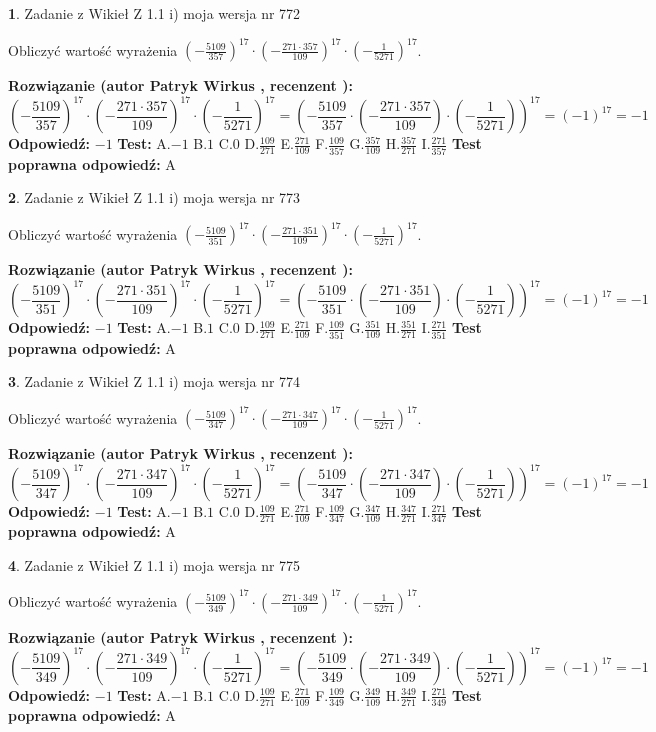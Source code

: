 \documentclass[12pt, a4paper]{article}
\theoremstyle{definition} %
\newtheorem{zad}{}
\newcommand{\zadStart}[1]{\begin{zad}#1\newline}
\newcommand{\zadStop}{\end{zad}}
\newcommand{\rozwStart}[2]{\noindent \textbf{Rozwiązanie (autor #1 , recenzent #2): }\newline}
\newcommand{\rozwStop}{\newline}
\newcommand{\odpStart}{\noindent \textbf{Odpowiedź:}\newline}
\newcommand{\odpStop}{\newline}
\newcommand{\testStart}{\noindent \textbf{Test:}\newline}
\newcommand{\testStop}{\newline}
\newcommand{\kluczStart}{\noindent \textbf{Test poprawna odpowiedź:}\newline}
\newcommand{\kluczStop}{\newline}
\begin{document}
\zadStart{Zadanie z Wikieł Z 1.1 i) moja wersja nr 772}

Obliczyć wartość wyrażenia $(-\frac{5109}{357})^{17} \cdot (-\frac{271 \cdot 357}{109})^{17} \cdot (-\frac{1}{5271})^{17}$.
\zadStop
\rozwStart{Patryk Wirkus}{}
$$(-\frac{5109}{357})^{17} \cdot (-\frac{271 \cdot 357}{109})^{17} \cdot (-\frac{1}{5271})^{17} = (-\frac{5109}{357} \cdot (-\frac{271 \cdot 357}{109}) \cdot (-\frac{1}{5271}))^{17} = (-1)^{17} = -1$$
\rozwStop
\odpStart
$-1$
\odpStop
\testStart
A.$-1$ B.$1$ C.$0$ D.$\frac{109}{271}$ E.$\frac{271}{109}$
F.$\frac{109}{357}$ G.$\frac{357}{109}$
H.$\frac{357}{271}$
I.$\frac{271}{357}$
\testStop
\kluczStart
A
\kluczStop



\zadStart{Zadanie z Wikieł Z 1.1 i) moja wersja nr 773}

Obliczyć wartość wyrażenia $(-\frac{5109}{351})^{17} \cdot (-\frac{271 \cdot 351}{109})^{17} \cdot (-\frac{1}{5271})^{17}$.
\zadStop
\rozwStart{Patryk Wirkus}{}
$$(-\frac{5109}{351})^{17} \cdot (-\frac{271 \cdot 351}{109})^{17} \cdot (-\frac{1}{5271})^{17} = (-\frac{5109}{351} \cdot (-\frac{271 \cdot 351}{109}) \cdot (-\frac{1}{5271}))^{17} = (-1)^{17} = -1$$
\rozwStop
\odpStart
$-1$
\odpStop
\testStart
A.$-1$ B.$1$ C.$0$ D.$\frac{109}{271}$ E.$\frac{271}{109}$
F.$\frac{109}{351}$ G.$\frac{351}{109}$
H.$\frac{351}{271}$
I.$\frac{271}{351}$
\testStop
\kluczStart
A
\kluczStop



\zadStart{Zadanie z Wikieł Z 1.1 i) moja wersja nr 774}

Obliczyć wartość wyrażenia $(-\frac{5109}{347})^{17} \cdot (-\frac{271 \cdot 347}{109})^{17} \cdot (-\frac{1}{5271})^{17}$.
\zadStop
\rozwStart{Patryk Wirkus}{}
$$(-\frac{5109}{347})^{17} \cdot (-\frac{271 \cdot 347}{109})^{17} \cdot (-\frac{1}{5271})^{17} = (-\frac{5109}{347} \cdot (-\frac{271 \cdot 347}{109}) \cdot (-\frac{1}{5271}))^{17} = (-1)^{17} = -1$$
\rozwStop
\odpStart
$-1$
\odpStop
\testStart
A.$-1$ B.$1$ C.$0$ D.$\frac{109}{271}$ E.$\frac{271}{109}$
F.$\frac{109}{347}$ G.$\frac{347}{109}$
H.$\frac{347}{271}$
I.$\frac{271}{347}$
\testStop
\kluczStart
A
\kluczStop



\zadStart{Zadanie z Wikieł Z 1.1 i) moja wersja nr 775}

Obliczyć wartość wyrażenia $(-\frac{5109}{349})^{17} \cdot (-\frac{271 \cdot 349}{109})^{17} \cdot (-\frac{1}{5271})^{17}$.
\zadStop
\rozwStart{Patryk Wirkus}{}
$$(-\frac{5109}{349})^{17} \cdot (-\frac{271 \cdot 349}{109})^{17} \cdot (-\frac{1}{5271})^{17} = (-\frac{5109}{349} \cdot (-\frac{271 \cdot 349}{109}) \cdot (-\frac{1}{5271}))^{17} = (-1)^{17} = -1$$
\rozwStop
\odpStart
$-1$
\odpStop
\testStart
A.$-1$ B.$1$ C.$0$ D.$\frac{109}{271}$ E.$\frac{271}{109}$
F.$\frac{109}{349}$ G.$\frac{349}{109}$
H.$\frac{349}{271}$
I.$\frac{271}{349}$
\testStop
\kluczStart
A
\kluczStop
\end{document}
